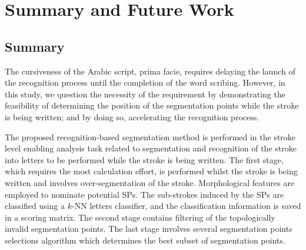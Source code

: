 %
%
%

\chapter{Summary and Future Work}
\label{chap:summary}

\section{Summary}
\label{sec:summary}

The cursiveness of the Arabic script, prima facie, requires delaying the launch of the recognition process until the completion of the word scribing. 
However, in this study, we question the necessity of the requirement by demonstrating the feasibility of determining the position of the segmentation points while the stroke is being written; and by doing so, accelerating the recognition process.

The proposed recognition-based segmentation method is performed in the stroke level enabling analysis task related to segmentation and recognition of the stroke into letters to be performed while the stroke is being written. 
The first stage, which requires the most calculation effort, is performed whilst the stroke is being written and involves over-segmentation of the stroke.
Morphological features are employed to nominate potential SPs.
The sub-strokes induced by the SPs are classified using a $k$-NN letters classifier, and the classification information is saved in a scoring matrix.
The second stage contains filtering of the topologically invalid segmentation points. 
The last stage involves several segmentation points selections algorithm which determines the best subset of segmentation points.

